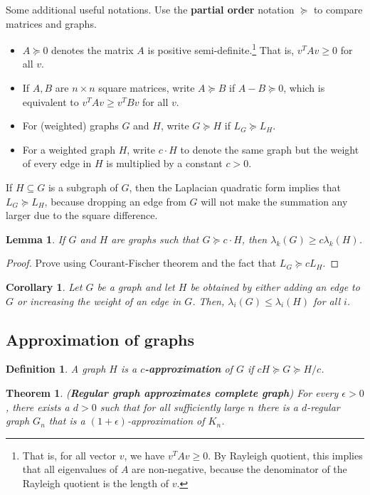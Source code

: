 \documentclass[]{article}
\newtheorem{theorem}{Theorem}[section]
\newtheorem{lemma}{Lemma}[section]
\newtheorem{corollary}{Corollary}[section]
\newtheorem{definition}{Definition}[section] %
\begin{document}
	Some additional useful notations. Use the \textbf{partial order} notation $\succeq$ to compare matrices and graphs. 
	\begin{itemize}
		\item $A \succeq 0$ denotes the matrix $A$ is positive semi-definite.\footnote{That is, for all vector $v$, we have $v^T A v \ge 0$. By Rayleigh quotient, this implies that all eigenvalues of $A$ are non-negative, because the denominator of the Rayleigh quotient is the length of $v$.} That is, $v^T A v \ge 0$ for all $v$.
		\item If $A, B$ are $n \times n$ square matrices, write $A \succeq B$ if $A - B \succeq 0$, which is equivalent to $v^T A v \ge v^T B v$ for all $v$.
		\item For (weighted) graphs $G$ and $H$, write $G \succeq H$ if $L_G \succeq L_H$.
		\item For a weighted graph $H$, write $c \cdot H$ to denote the same graph but the weight of every edge in $H$ is multiplied by a constant $c > 0$.
	\end{itemize}
	If $H \subseteq G$ is a subgraph of $G$, then the Laplacian quadratic form implies that $L_G \succeq L_H$, because dropping an edge from $G$ will not make the summation any larger due to the square difference. 
	
	\begin{lemma}
		If $G$ and $H$ are graphs such that $G \succeq c \cdot H$, then $\lambda_k(G) \ge c\lambda_k(H)$.
	\end{lemma}
	\begin{proof}
		Prove using Courant-Fischer theorem and the fact that $L_G \succeq cL_H$.
	\end{proof}
	
	\begin{corollary}
		Let $G$ be a graph and let $H$ be obtained by either adding an edge to $G$ or increasing the weight of an edge in $G$. Then, $\lambda_i(G) \le \lambda_i(H)$ for all $i$.
	\end{corollary}
	
	\subsection{Approximation of graphs}
	\begin{definition}
		A graph $H$ is a \textbf{$c$-approximation} of $G$ if $cH \succeq G \succeq H/c$.
	\end{definition}
	
	\begin{theorem} (\textbf{Regular graph approximates complete graph})
		For every $\epsilon > 0$, there exists a $d > 0$ such that for all sufficiently large $n$ there is a $d$-regular graph $G_n$ that is a $(1+\epsilon)$-approximation of $K_n$.
	\end{theorem}
	
\end{document}
